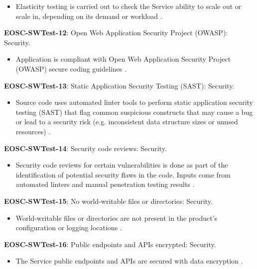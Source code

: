 \begin{itemize}
    \item Elasticity testing is carried out to check the Service ability to scale out or scale in, depending on its demand or workload \cite{orviz_fernandez_eosc-synergy_2020}.
\end{itemize}

\textbf{EOSC-SWTest-12}: Open Web Application Security Project (OWASP): Security.

\begin{itemize}
    \item Application is compliant with Open Web Application Security Project (OWASP) secure coding guidelines \cite{orviz_set_2017}.
\end{itemize}

\textbf{EOSC-SWTest-13}: Static Application Security Testing (SAST): Security.

\begin{itemize}
    \item Source code uses automated linter tools to perform static application security testing (SAST) that flag common suspicious constructs that may cause a bug or lead to a security risk (e.g. inconsistent data structure sizes or unused resources) \cite{orviz_set_2017}.
\end{itemize}

\textbf{EOSC-SWTest-14}: Security code reviews: Security.

\begin{itemize}
    \item Security code reviews for certain vulnerabilities is done as part of the identification of potential security flaws in the code. Inputs  come from automated linters and manual penetration testing results \cite{gillies_modelling_1992,shepherdson_cessda_2019,orviz_set_2017}.
\end{itemize}

\textbf{EOSC-SWTest-15}: No world-writable files or directories: Security.

\begin{itemize}
    \item World-writable files or directories are not present in the product's configuration or logging locations \cite{orviz_set_2017}.
\end{itemize}

\textbf{EOSC-SWTest-16}: Public endpoints and APIs encrypted: Security.

\begin{itemize}
    \item The Service public endpoints and APIs are secured with data encryption \cite{orviz_fernandez_eosc-synergy_2020}.
\end{itemize}

